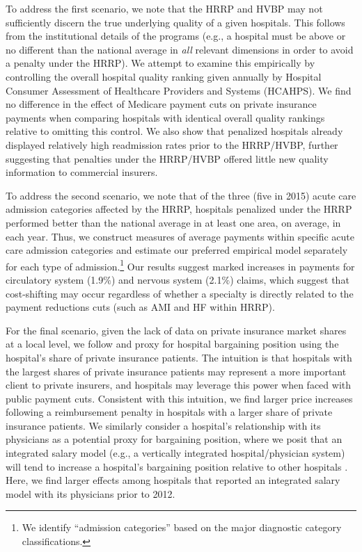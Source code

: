 \documentclass[12pt]{article}
\begin{document}
To address the first scenario, we note that the HRRP and HVBP may not sufficiently discern the true underlying quality of a given hospitals. This follows from the institutional details of the programs (e.g., a hospital must be above or no different than the national average in \textit{all} relevant dimensions in order to avoid a penalty under the HRRP). We attempt to examine this empirically by controlling the overall hospital quality ranking given annually by Hospital Consumer Assessment of Healthcare Providers and Systems (HCAHPS). We find no difference in the effect of Medicare payment cuts on private insurance payments when comparing hospitals with identical overall quality rankings relative to omitting this control. We also show that penalized hospitals already displayed relatively high readmission rates prior to the HRRP/HVBP, further suggesting that penalties under the HRRP/HVBP offered little new quality information to commercial insurers.

To address the second scenario, we note that of the three (five in 2015) acute care admission categories affected by the HRRP, hospitals penalized under the HRRP performed better than the national average in at least one area, on average, in each year.  Thus, we construct measures of average payments within specific acute care admission categories and estimate our preferred empirical model separately for each type of admission.\footnote{We identify ``admission categories'' based on the major diagnostic category classifications.}   Our results suggest marked increases in payments for circulatory system (1.9$\%$) and nervous system (2.1$\%$) claims, which suggest that cost-shifting may occur regardless of whether a specialty is directly related to the payment reductions cuts (such as AMI and HF within HRRP).

For the final scenario, given the lack of data on private insurance market shares at a local level, we follow \cite{wu2010} and proxy for hospital bargaining position using the hospital's share of private insurance patients. The intuition is that hospitals with the largest shares of private insurance patients may represent a more important client to private insurers, and hospitals may leverage this power when faced with public payment cuts. Consistent with this intuition, we find larger price increases following a reimbursement penalty in hospitals with a larger share of private insurance patients. We similarly consider a hospital's relationship with its physicians as a potential proxy for bargaining position, where we posit that an integrated salary model (e.g., a vertically integrated hospital/physician system) will tend to increase a hospital's bargaining position relative to other hospitals \citep{lewis2015}. Here, we find larger effects among hospitals that reported an integrated salary model with its physicians prior to 2012.
\end{document}
